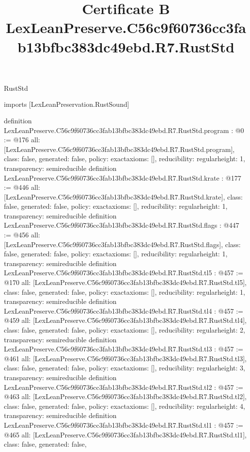\begin{lexlean}{RustStd}
\title{Certificate B LexLeanPreserve.C56c9f60736cc3fab13bfbc383dc49ebd.R7.RustStd}
\begin{coremodule}
imports [LexLeanPreservation.RustSound]

definition LexLeanPreserve.C56c9f60736cc3fab13bfbc383dc49ebd.R7.RustStd.program : @0 := @176 {
  all: [LexLeanPreserve.C56c9f60736cc3fab13bfbc383dc49ebd.R7.RustStd.program],
  class: false,
  generated: false,
  policy: exact{axioms: []},
  reducibility: regular{height: 1},
  transparency: semireducible
}
definition LexLeanPreserve.C56c9f60736cc3fab13bfbc383dc49ebd.R7.RustStd.krate : @177 := @446 {
  all: [LexLeanPreserve.C56c9f60736cc3fab13bfbc383dc49ebd.R7.RustStd.krate],
  class: false,
  generated: false,
  policy: exact{axioms: []},
  reducibility: regular{height: 1},
  transparency: semireducible
}
definition LexLeanPreserve.C56c9f60736cc3fab13bfbc383dc49ebd.R7.RustStd.flags : @447 := @456 {
  all: [LexLeanPreserve.C56c9f60736cc3fab13bfbc383dc49ebd.R7.RustStd.flags],
  class: false,
  generated: false,
  policy: exact{axioms: []},
  reducibility: regular{height: 1},
  transparency: semireducible
}
definition LexLeanPreserve.C56c9f60736cc3fab13bfbc383dc49ebd.R7.RustStd.tl5 : @457 := @170 {
  all: [LexLeanPreserve.C56c9f60736cc3fab13bfbc383dc49ebd.R7.RustStd.tl5],
  class: false,
  generated: false,
  policy: exact{axioms: []},
  reducibility: regular{height: 1},
  transparency: semireducible
}
definition LexLeanPreserve.C56c9f60736cc3fab13bfbc383dc49ebd.R7.RustStd.tl4 : @457 := @459 {
  all: [LexLeanPreserve.C56c9f60736cc3fab13bfbc383dc49ebd.R7.RustStd.tl4],
  class: false,
  generated: false,
  policy: exact{axioms: []},
  reducibility: regular{height: 2},
  transparency: semireducible
}
definition LexLeanPreserve.C56c9f60736cc3fab13bfbc383dc49ebd.R7.RustStd.tl3 : @457 := @461 {
  all: [LexLeanPreserve.C56c9f60736cc3fab13bfbc383dc49ebd.R7.RustStd.tl3],
  class: false,
  generated: false,
  policy: exact{axioms: []},
  reducibility: regular{height: 3},
  transparency: semireducible
}
definition LexLeanPreserve.C56c9f60736cc3fab13bfbc383dc49ebd.R7.RustStd.tl2 : @457 := @463 {
  all: [LexLeanPreserve.C56c9f60736cc3fab13bfbc383dc49ebd.R7.RustStd.tl2],
  class: false,
  generated: false,
  policy: exact{axioms: []},
  reducibility: regular{height: 4},
  transparency: semireducible
}
definition LexLeanPreserve.C56c9f60736cc3fab13bfbc383dc49ebd.R7.RustStd.tl1 : @457 := @465 {
  all: [LexLeanPreserve.C56c9f60736cc3fab13bfbc383dc49ebd.R7.RustStd.tl1],
  class: false,
  generated: false,
}
\end{coremodule}
\end{lexlean}
